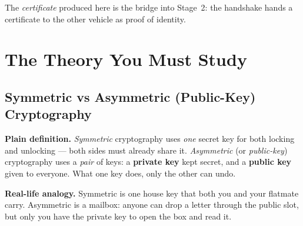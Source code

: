 \documentclass[11pt,a4paper]{report}
\begin{document}
\begin{center}
\end{center}

\noindent The \emph{certificate} produced here is the bridge into Stage~2: the
handshake hands a certificate to the other vehicle as proof of identity.

\section{The Theory You Must Study}

\subsection{Symmetric vs Asymmetric (Public-Key) Cryptography}
\textbf{Plain definition.} \emph{Symmetric} cryptography uses \emph{one} secret
key for both locking and unlocking --- both sides must already share it.
\emph{Asymmetric} (or \emph{public-key}) cryptography uses a \emph{pair} of
keys: a \textbf{private key} kept secret, and a \textbf{public key} given to
everyone. What one key does, only the other can undo.

\textbf{Real-life analogy.} Symmetric is one house key that both you and your
flatmate carry. Asymmetric is a mailbox: anyone can drop a letter through the
public slot, but only you have the private key to open the box and read it.
\end{document}
